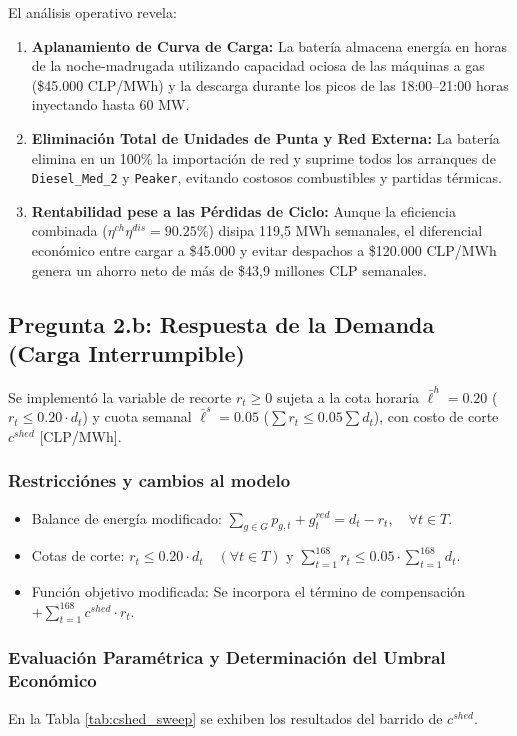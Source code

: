 \documentclass[10pt,letterpaper]{article}
\begin{document}
El análisis operativo revela:
\begin{enumerate}
    \item \textbf{Aplanamiento de Curva de Carga:} La batería almacena energía en horas de la noche-madrugada utilizando capacidad ociosa de las máquinas a gas (\$45.000 CLP/MWh) y la descarga durante los picos de las 18:00--21:00 horas inyectando hasta 60 MW.
    \item \textbf{Eliminación Total de Unidades de Punta y Red Externa:} La batería elimina en un 100\% la importación de red y suprime todos los arranques de \texttt{Diesel\_Med\_2} y \texttt{Peaker}, evitando costosos combustibles y partidas térmicas.
    \item \textbf{Rentabilidad pese a las Pérdidas de Ciclo:} Aunque la eficiencia combinada ($\eta^{ch}\eta^{dis} = 90.25\%$) disipa 119,5 MWh semanales, el diferencial económico entre cargar a \$45.000 y evitar despachos a \$120.000 CLP/MWh genera un ahorro neto de más de \$43,9 millones CLP semanales.
\end{enumerate}

\subsection{Pregunta 2.b: Respuesta de la Demanda (Carga Interrumpible)}
\label{subsec:2b}

Se implementó la variable de recorte $r_t \ge 0$ sujeta a la cota horaria $\bar{\ell}^h = 0.20$ ($r_t \le 0.20 \cdot d_t$) y cuota semanal $\bar{\ell}^s = 0.05$ ($\sum r_t \le 0.05 \sum d_t$), con costo de corte $c^{shed}$ [CLP/MWh].

\subsubsection*{Restricciónes y cambios al modelo}
\begin{itemize}
    \item Balance de energía modificado: $\sum_{g \in G} p_{g,t} + g_t^{red} = d_t - r_t, \quad \forall t \in T$.
    \item Cotas de corte: $r_t \le 0.20 \cdot d_t \quad (\forall t \in T)$ y $\sum_{t=1}^{168} r_t \le 0.05 \cdot \sum_{t=1}^{168} d_t$.
    \item Función objetivo modificada: Se incorpora el término de compensación $+\sum_{t=1}^{168} c^{shed} \cdot r_t$.
\end{itemize}

\subsubsection*{Evaluación Paramétrica y Determinación del Umbral Económico}
En la Tabla \ref{tab:cshed_sweep} se exhiben los resultados del barrido de $c^{shed}$.
\end{document}
